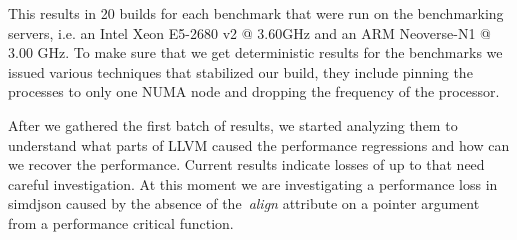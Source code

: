 This results in 20 builds for each benchmark that were run on the benchmarking
servers, i.e. an Intel Xeon E5-2680 v2 @ 3.60GHz and an ARM Neoverse-N1 @ 3.00
GHz. To make sure that we get deterministic results for the benchmarks we issued
various techniques that stabilized our build, they include pinning the processes
to only one NUMA node and dropping the frequency of the processor.

After we gathered the first batch of results, we started analyzing them to
understand what parts of LLVM caused the performance regressions and how can we
recover the performance. Current results indicate losses of up to \todo{} that
need careful investigation. At this moment we are investigating a performance
loss in simdjson caused by the absence of the~\textit{align} attribute on a
pointer argument from a performance critical function.
